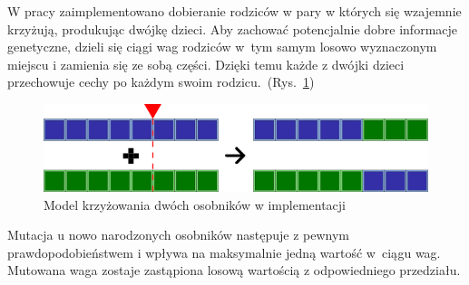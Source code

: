 W pracy zaimplementowano dobieranie rodziców w pary w których się wzajemnie krzyżują, produkując dwójkę dzieci. Aby zachować potencjalnie dobre informacje genetyczne, dzieli się ciągi wag rodziców w~tym samym losowo wyznaczonym miejscu i zamienia się ze sobą części. Dzięki temu każde z dwójki dzieci przechowuje cechy po każdym swoim rodzicu.~(Rys.~\ref{fig:krzyzowanie})

\begin{figure}
    \centering
    \includegraphics[scale=.6]{graphics/genetyk_krzyzowanie2.png}
    \caption{Model krzyżowania dwóch osobników w implementacji}
    \label{fig:krzyzowanie}
\end{figure}

Mutacja u nowo narodzonych osobników następuje z pewnym prawdopodobieństwem i wpływa na maksymalnie jedną wartość w~ciągu wag. Mutowana waga zostaje zastąpiona losową wartością z odpowiedniego przedziału.


